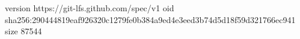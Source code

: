 version https://git-lfs.github.com/spec/v1
oid sha256:290444819eaf926320c1279fe0b384a9ed4e3eed3b74d5d18f59d321766ec941
size 87544
